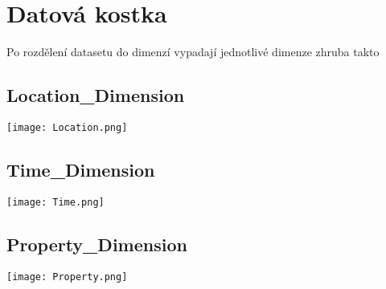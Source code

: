 \section{Datová kostka}
Po rozdělení datasetu do dimenzí vypadají jednotlivé dimenze zhruba takto

\subsection{Location\_Dimension}
\texttt{[image: Location.png]}

\subsection{Time\_Dimension}
\texttt{[image: Time.png]}

\subsection{Property\_Dimension}
\texttt{[image: Property.png]}